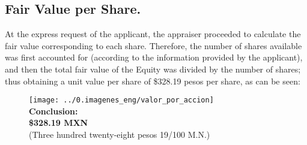 \subsection{Fair Value per Share.}

At the express request of the applicant, the appraiser proceeded to calculate the fair value corresponding to each share. Therefore, the number of shares available was first accounted for (according to the information provided by the applicant), and then the total fair value of the Equity was divided by the number of shares; thus obtaining a  \textcolor{principal}{unit value per share of \$328.19 pesos per share}, as can be seen:

\begin{figure}[H]
\centering
\texttt{[image: ../0.imagenes\_eng/valor\_por\_accion]}\\

\textbf{\textcolor{principal}{Conclusion:}}\\

\textbf{\$328.19 MXN}\\
(\textcolor{principal}{Three hundred twenty-eight pesos 19/100 M.N.})
\end{figure}
